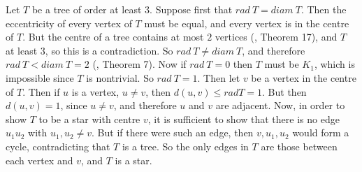 Let $T$ be a tree of order at least $3$. Suppose first that $rad\ T = diam\ T$.
Then the eccentricity of every vertex of $T$ must be equal, and every vertex
is in the centre of $T$. But the centre of a tree contains at most $2$ vertices
(\cite{notes}, Theorem 17), and $T$ at least $3$, so this is a contradiction.
So $rad\ T \neq diam\ T$, and therefore $rad\ T < diam\ T=2$ (\cite{notes}, Theorem 7).
Now if $rad\ T = 0$ then $T$ must be $K_1$, which is impossible since $T$ is
nontrivial. So $rad\ T = 1$. Then let $v$ be a vertex in the centre of $T$. Then if
$u$ is a vertex, $u \neq v$, then $d(u,v) \le rad T = 1$. But then $d(u,v)=1$,
since $u \neq v$, and therefore $u$ and $v$ are adjacent. Now, in order to show
$T$ to be a star with centre $v$, it is sufficient to show that there is no edge
$u_1u_2$ with $u_1,u_2 \neq v$. But if there were such an edge, then $v,u_1,u_2$
would form a cycle, contradicting that $T$ is a tree. So the only edges in $T$ are
those between each vertex and $v$, and $T$ is a star.

